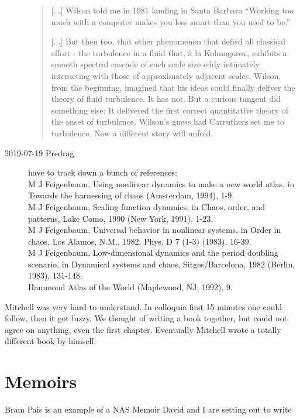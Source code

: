\begin{description}
\begin{quote}
[...]
Wilson told me in 1981 landing in Santa Barbara ``Working too much with a
computer makes you less smart than you used to be.''

[...]
But then too, that other phenomenon that defied all classical effort -
the turbulence in a fluid that, à la Kolmogorov, exhibits a smooth
spectral cascade of each scale size eddy intimately interacting with
those of approximately adjacent scales. Wilson, from the beginning,
imagined that his ideas could finally deliver the theory of fluid
turbulence. It has not. But a curious tangent did something else: It
delivered the first correct quantitative theory of the onset of
turbulence. Wilson’s guess had Carruthers set me to turbulence. Now a
different story will unfold.

\end{quote}

\item[2019-07-19 Predrag]
have to track down a bunch of references:\\
 M J Feigenbaum, Using nonlinear dynamics to make a new world atlas, in Towards the harnessing of chaos (Amsterdam, 1994), 1-9.
\\
M J Feigenbaum, Scaling function dynamics, in Chaos, order, and patterns, Lake Como, 1990 (New York, 1991), 1-23.
\\
M J Feigenbaum, Universal behavior in nonlinear systems, in Order in chaos, Los Alamos, N.M., 1982, Phys. D 7 (1-3) (1983), 16-39.
\\
M J Feigenbaum, Low-dimensional dynamics and the period doubling scenario, in Dynamical systems and chaos, Sitges/Barcelona, 1982 (Berlin, 1983), 131-148.
\\
Hammond Atlas of the World (Maplewood, NJ, 1992), 9.

\end{description}


Mitchell was very hard to understand. In colloquia first 15 minutes one
could follow, then it got fuzzy. We thought of writing a book together,
but could not agree on anything, even the first chapter. Eventually
Mitchell wrote a totally different book by himself.

\section{Memoirs}
\label{sect:Memoirs}

{Bram Pais} is an example of a NAS Memoir David and I are setting out to
write

